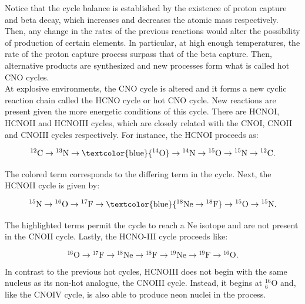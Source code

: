 \documentclass[openany]{book}
\begin{document}
Notice that the cycle balance is established by the existence of proton capture and beta decay, which increases and decreases the atomic mass respectively. Then, any change in the rates of the previous reactions would alter the possibility of production of certain elements. In particular, at high enough temperatures, the rate of the proton capture process surpass that of the beta capture. Then, alternative products are synthesized and new processes form what is called hot CNO cycles. \\ 

At explosive environments, the CNO cycle is altered and it forms a new cyclic reaction chain called the HCNO cycle or hot CNO cycle.  New reactions are present given the more energetic conditions of this cycle. There are HCNOI, HCNOII and HCNOIII cycles, which are closely related with the CNOI, CNOII and CNOIII cycles respectively. For instance, the HCNOI proceeds as: 

\begin{equation} \label{eq:reaction_HCNO_C}
	\mathrm{{}^{12}C  \rightarrow {}^{13}N  \rightarrow \textcolor{blue}{{}^{14}O}  \rightarrow {}^{14}N  \rightarrow {}^{15}O  \rightarrow {}^{15}N \rightarrow {}^{12}C}.
\end{equation}

The colored term corresponds to the differing term in the cycle. Next, the HCNOII cycle is given by: 

\begin{equation} \label{eq:reaction_HCNO_N}
	\mathrm{{}^{15}N  \rightarrow {}^{16}O  \rightarrow {}^{17}F  \rightarrow \textcolor{blue}{{}^{18}Ne  \rightarrow {}^{18}F}  \rightarrow {}^{15}O \rightarrow {}^{15}N  }.
\end{equation}

The highlighted terms permit the cycle to reach a Ne isotope and are not present in the CNOII cycle. Lastly, the HCNO-III cycle proceeds like: 

\begin{equation} \label{eq:reaction_HCNO_O}
	\mathrm{{}^{16}O  \rightarrow {}^{17}F  \rightarrow {}^{18}Ne \rightarrow {}^{18}F  \rightarrow {}^{19}Ne  \rightarrow {}^{19}F \rightarrow {}^{16}O }.
\end{equation}

In contrast to the previous hot cycles, HCNOIII does not begin with the same nucleus as its non-hot analogue, the CNOIII cycle. Instead, it begins at $\mathrm{{}^{16}_{6}O}$ and, like the CNOIV cycle, is also able to produce neon nuclei in the process. \\
\end{document}
